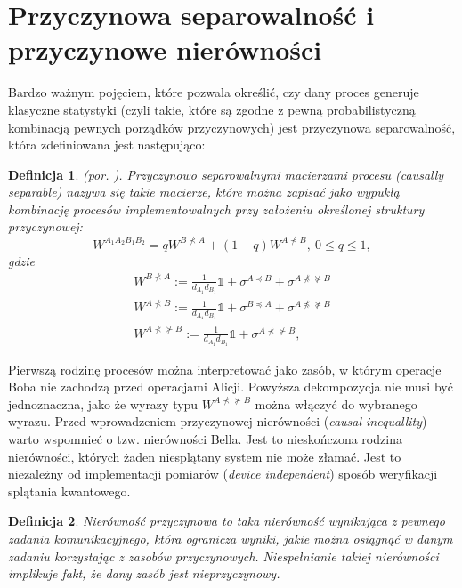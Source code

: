 \documentclass[10pt]{article} %
\newtheorem{definicja}{Definicja}
\newcommand{\WAll}{W^{A_1A_2B_1B_2}}
\newcommand{\I}{\mathbb{1}}
\begin{document}
\section{Przyczynowa separowalność i przyczynowe nierówności}
Bardzo ważnym pojęciem, które pozwala określić, czy dany proces generuje klasyczne statystyki (czyli takie, które są zgodne z pewną probabilistyczną kombinacją pewnych porządków przyczynowych) jest przyczynowa separowalność, która zdefiniowana jest następująco:
\begin{definicja}
(por. \cite{process_matrix}).
Przyczynowo separowalnymi macierzami procesu (\textit{causally separable}) nazywa się takie macierze, które można zapisać jako wypukłą kombinację procesów implementowalnych przy założeniu określonej struktury przyczynowej:
\begin{equation}
\label{eq:sep}
\WAll = qW^{B \nprec A} + (1-q)W^{A \nprec B},~0 \leq q \leq 1,
\end{equation}
gdzie
\begin{gather}
W^{B \nprec A} := \frac{1}{d_{A_1}d_{B_1}}\I + \sigma^{A \preceq B} + \sigma^{A \npreceq \nsucceq B} \\
W^{A \nprec B} := \frac{1}{d_{A_1}d_{B_1}}\I + \sigma^{B \preceq A} + \sigma^{A \npreceq \nsucceq B} \\
W^{A \nprec \nsucc B} := \frac{1}{d_{A_1}d_{B_1}}\I + \sigma^{A \nprec \nsucc B},
\end{gather}
\end{definicja}
Pierwszą rodzinę procesów można interpretować jako zasób, w którym operacje Boba nie zachodzą przed operacjami Alicji.
Powyższa dekompozycja nie musi być jednoznaczna, jako że wyrazy typu $W^{A \nprec \nsucc B}$ można włączyć do wybranego wyrazu.
Przed wprowadzeniem przyczynowej nierówności (\textit{causal inequallity}) warto wspomnieć o tzw. nierówności Bella. Jest to nieskończona rodzina nierówności, których żaden niesplątany system nie może złamać. Jest to niezależny od implementacji pomiarów (\textit{device independent}) sposób weryfikacji splątania kwantowego. 
\begin{definicja}
Nierówność przyczynowa to taka nierówność wynikająca z pewnego zadania komunikacyjnego, która ogranicza wyniki, jakie można osiągnąć w danym zadaniu korzystając z zasobów przyczynowych. Niespełnianie takiej nierówności implikuje fakt, że dany zasób jest nieprzyczynowy.
\end{definicja}
\end{document}
